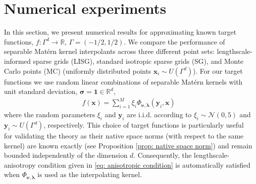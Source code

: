 \documentclass[pdflatex,sn-mathphys-num]{sn-jnl}%
\theoremstyle{thmstyleone}%
\theoremstyle{thmstyletwo}%
\theoremstyle{thmstylethree}%
\begin{document}
\section{Numerical experiments}\label{sec: numerics}
In this section, we present numerical results for approximating known target functions, \(f:\Gamma^d\rightarrow\mathbb{R}\), \(\Gamma=(-1/2,1/2)\). We compare the performance of separable Mat\'ern kernel interpolants across three different point sets: lengthscale-informed sparse grids (LISG), standard isotropic sparse grids (SG), and Monte Carlo points (MC) (uniformly distributed points \(\mathbf{x}_i\sim U(\Gamma^d)\)). For our target functions we use random linear combinations of separable Mat\'ern kernels with unit standard deviation, \(\boldsymbol{\sigma}=\mathbf{1}\in\mathbb{R}^d\),
\begin{align}\label{eq: target function}
    f(\mathbf{x})=\sum_{i=1}^M\xi_i\Phi_{\boldsymbol{\nu},\boldsymbol{\lambda}}(\mathbf{y}_i,\mathbf{x})\nonumber
\end{align}
where the random parameters \(\xi_i\) and \(\mathbf{y}_i\) are i.i.d. according to \(\xi_i\sim\mathcal{N}(0,5)\) and \(\mathbf{y}_i\sim U\left(\Gamma^d\right)\), respectively. This choice of target functions is particularly useful for validating the theory as their native space norms (with respect to the same kernel) are known exactly (see Proposition \ref{prop: native space norm}) and remain bounded independently of the dimension \(d\). Consequently, the lengthscale-anisotropy condition given in \eqref{eq: anisotropic condition} is automatically satisfied when \(\Phi_{\boldsymbol{\nu},\boldsymbol{\lambda}}\) is used as the interpolating kernel.
\end{document}
